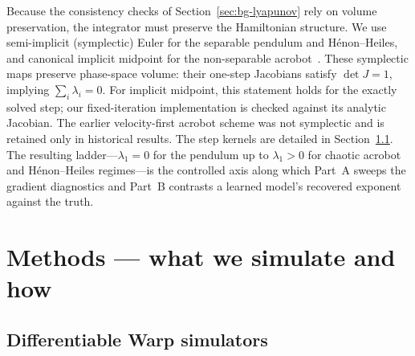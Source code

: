 \documentclass[11pt]{article}
\begin{document}
Because the consistency checks of Section~\ref{sec:bg-lyapunov} rely on volume preservation, the integrator must preserve the Hamiltonian structure. We use semi-implicit (symplectic) Euler for the separable pendulum and Hénon--Heiles, and canonical implicit midpoint for the non-separable acrobot~\cite{hairer2006geometric,leimkuhler2004simulating}. These symplectic maps preserve phase-space volume: their one-step Jacobians satisfy $\det J=1$, implying $\sum_i\lambda_i=0$. For implicit midpoint, this statement holds for the exactly solved step; our fixed-iteration implementation is checked against its analytic Jacobian. The earlier velocity-first acrobot scheme was not symplectic and is retained only in historical results. The step kernels are detailed in Section~\ref{sec:m-warp}. The resulting ladder---$\lambda_1=0$ for the pendulum up to $\lambda_1>0$ for chaotic acrobot and Hénon--Heiles regimes---is the controlled axis along which Part~A sweeps the gradient diagnostics and Part~B contrasts a learned model's recovered exponent against the truth.

\section{Methods --- what we simulate and how}\label{sec:methods}

\subsection{Differentiable Warp simulators}\label{sec:m-warp}
\end{document}

